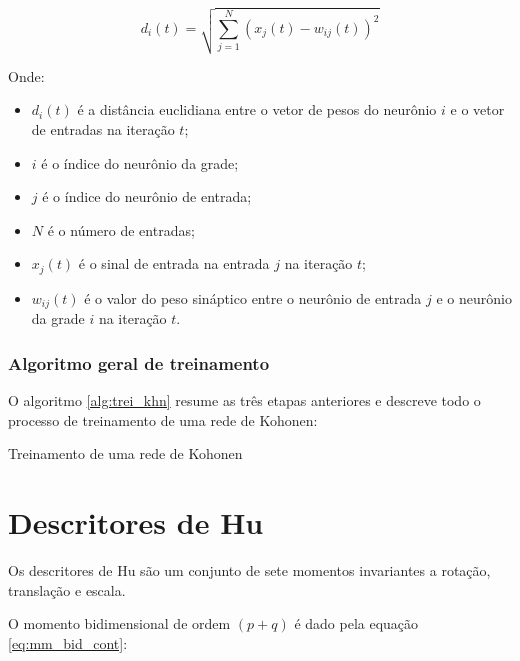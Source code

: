 \begin{equation}\label{eq:dit_ecl}
d_i(t) = \sqrt{\sum_{j = 1}^N \left( x_j(t) - w_{ij}(t) \right)^2}
\end{equation}

Onde:

\begin{itemize}
\item $ d_i(t) $ é a distância euclidiana entre o vetor de pesos do
neurônio $ i $ e o vetor de entradas na iteração $ t $;
\item $ i $ é o índice do neurônio da grade;
\item $ j $ é o índice do neurônio de entrada;
\item $ N $ é o número de entradas;
\item $ x_j(t) $ é o sinal de entrada na entrada $ j $ na iteração $ t $;
\item $ w_{ij}(t) $ é o valor do peso sináptico entre o neurônio de
entrada $ j $ e o neurônio da grade $ i $ na iteração $ t $.
\end{itemize}

\subsubsection{Algoritmo geral de treinamento}

O algoritmo \ref{alg:trei_khn} resume as três etapas anteriores e descreve
todo o processo de treinamento de uma rede de Kohonen:

\begin{algorithm}[H]
\caption{Treinamento de uma rede de Kohonen}\label{alg:trei_khn}
\end{algorithm}

\section{Descritores de Hu}\label{sec:desc_hu}

Os descritores de Hu são um conjunto de sete momentos invariantes a rotação,
translação e escala.

O momento bidimensional de ordem $ (p+q) $ é dado pela
equação \ref{eq:mm_bid_cont}:

